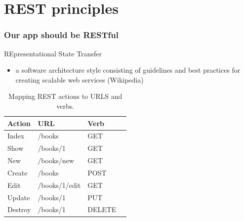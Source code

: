 \documentclass[10pt,t,xcolor=dvipsnames]{beamer}
\begin{document}
\section{REST principles}
\begin{frame}[fragile]
\frametitle{Our app should be RESTful}
\pause
\alert{RE}presentational \alert{S}tate \alert{T}ransfer
\pause
\begin{itemize}[<+->]
\item a software architecture style consisting of guidelines and best practices for creating scalable web services (Wikipedia)
\end{itemize}
\pause
\begin{table}
\scriptsize
\centering
\begin{tabular}{|l|l|l|l|}\hline
Action  &URL&  Verb \\ \hline\hline
Index&/books&GET\\
Show&/books/1&GET\\
New&/books/new&GET\\
Create&/books&POST\\
Edit&/books/1/edit&GET\\
Update&/books/1&PUT\\
Destroy&/books/1&DELETE\\ \hline
\end{tabular}
\caption{\footnotesize Mapping REST actions to URLS and verbs.}
\end{table}

\end{frame}
\end{document}

